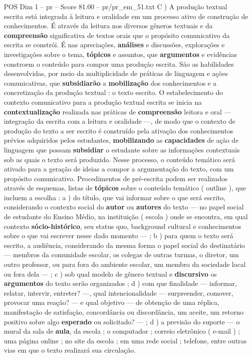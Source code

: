 \begin{textsample}{POS Dim 1 – pr – Score 81.00 – pr/pr\_em\_51.txt}
C ) A produção textual escrita está integrada à leitura e oralidade em um processo ativo de construção de conhecimentos.
É através da leitura nos diversos gêneros textuais e da \textbf{compreensão} significativa de textos orais que o propósito comunicativo da escrita se constrói.
É nas apreciações, \textbf{análises} e discussões, explorações e investigações sobre o tema, \textbf{tópicos} e assuntos, que \textbf{argumentos} e evidências constroem o conteúdo para compor uma produção escrita.
São as habilidades desenvolvidas, por meio da multiplicidade de práticas de linguagem e ações comunicativas, que \textbf{subsidiarão} a \textbf{mobilização} dos conhecimentos e a concretização da produção textual : o texto escrito.
O estabelecimento do contexto comunicativo para a produção textual escrita se inicia na \textbf{contextualização} realizada nas práticas de \textbf{compreensão} leitora e oral — integração da escrita com a leitura e oralidade —, de modo que o contexto de produção do texto a ser escrito é construído pela ativação dos conhecimentos prévios adquiridos pelos estudantes, \textbf{mobilizando} as \textbf{capacidades} de ação de linguagem que possam \textbf{subsidiar} o estudante sobre as informações contextuais sob as quais o texto será produzido.
Nesse processo, o conteúdo temático será ativado para a geração de ideias a compor a argumentação do texto, com um propósito comunicativo.
Procedimentos de pré-escrita podem ser realizados através de esquemas, listas de \textbf{tópicos} sobre o conteúdo temático ( outline ), que incluem a escolha : a ) do título, que vai informar sobre o que será escrito, considerando o contexto social do \textbf{autor} ou \textbf{autores} do texto — no papel social de estudante do Ensino Médio, na instituição ( escola ) onde se encontra, em qual contexto \textbf{sócio-histórico}, seu status quo, background cultural e conhecimentos sobre o que vai escrever nesse dado momento — ; b ) para quem o texto será escrito, a audiência, considerando da mesma forma o papel social do destinatário — membros da comunidade escolar, os colegas de outras turmas, o diretor, um outro professor, ou para fora do ambiente escolar, um membro da sociedade local ou fora dela — ; c ) sob qual modelo de gênero textual e \textbf{discursivo} os \textbf{argumentos} do texto serão organizados ; d ) com que finalidade — informar, relatar, intervir, entreter? —, qual intencionalidade — surpreender, comover, provocar uma reação? — e qual objetivo — de obtenção de uma réplica, manifestação de satisfação, concordância ou discordância, um aceite, um retorno positivo sobre algo \textbf{esperado} ou solicitado? — ; d ) a previsão do suporte — o mural da sala de \textbf{aula}, da escola ; o computador ; correio eletrônico ( e-mail ) ; uma página online ; no site da escola ; em uma rede social ; telefone, entre outras vias em que o texto realizará sua circulação.

\end{textsample}
